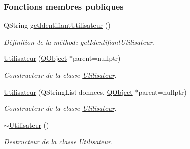 \subsubsection*{Fonctions membres publiques}
\begin{DoxyCompactItemize}
\item 
Q\+String \hyperlink{class_utilisateur_af944ac02cca7914480e20f46c4dd0e56}{get\+Identifiant\+Utilisateur} ()
\begin{DoxyCompactList}\small\item\em Définition de la méthode get\+Identifiant\+Utilisateur. \end{DoxyCompactList}\item 
\hyperlink{class_utilisateur_a89e539739c5f6c6790909ac5fc5729b8}{Utilisateur} (\hyperlink{class_q_object}{Q\+Object} $\ast$parent=nullptr)
\begin{DoxyCompactList}\small\item\em Constructeur de la classe \hyperlink{class_utilisateur}{Utilisateur}. \end{DoxyCompactList}\item 
\hyperlink{class_utilisateur_a6bfd9ef83e910946f3cf3b6e0fcca343}{Utilisateur} (Q\+String\+List donnees, \hyperlink{class_q_object}{Q\+Object} $\ast$parent=nullptr)
\begin{DoxyCompactList}\small\item\em Constructeur de la classe \hyperlink{class_utilisateur}{Utilisateur}. \end{DoxyCompactList}\item 
\hyperlink{class_utilisateur_a6631539ceecd6140fe525eb91485537b}{$\sim$\+Utilisateur} ()
\begin{DoxyCompactList}\small\item\em Destructeur de la classe \hyperlink{class_utilisateur}{Utilisateur}. \end{DoxyCompactList}\end{DoxyCompactItemize}
